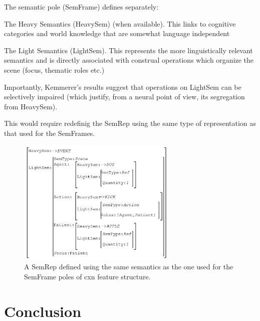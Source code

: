 \documentclass{article}
\begin{document}
The semantic pole (SemFrame) defines separately:
\begin{description}

\item{The Heavy Semantics (HeavySem)} (when available). This links to cognitive categories and world knowledge that are somewhat language independent
\item{The Light Semantics (LightSem)}. This represents the more linguistically relevant semantics and is directly associated with construal operations which organize the scene (focus, thematic roles etc.)
\end{description}

Importantly, Kemmerer’s results suggest that operations on LightSem can be selectively impaired (which justify, from a neural point of view, its segregation from HeavySem).

This would require redefinig the SemRep using the same type of representation as that used for the SemFrames.

\begin{figure}
	\centering
	\includegraphics[width=3.0in]{Figures/SemRep_FeatStruct.png}
	\caption{A SemRep defined using the same semantics as the one used for the SemFrame poles of cxn feature structure.}
	\label{fig:semrep_featstruct}
\end{figure}


\section{Conclusion}
\end{document}
